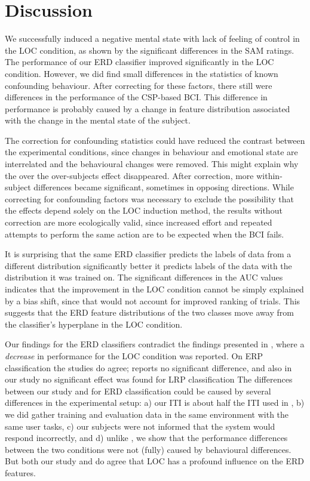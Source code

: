 \section{Discussion}
We successfully induced a negative mental state with lack of feeling of control
in the \ac{LOC} condition, as shown by the significant differences in the
\ac{SAM} ratings.
% 
The performance of our \ac{ERD} classifier improved significantly in the
\ac{LOC} condition. However, we did find small differences in the statistics of
known confounding behaviour. After correcting for these factors, there still
were differences in the performance of the \ac{CSP}-based \ac{BCI}. This
difference in performance is probably caused by a change in feature
distribution associated with the change in the mental state of the subject.

The correction for confounding statistics could have reduced the contrast
between the experimental conditions, since changes in behaviour and emotional
state are interrelated and the behavioural changes were removed. This might
explain why the over the over-subjects effect disappeared. After correction,
more within-subject differences became significant, sometimes in opposing directions.
%
While correcting for confounding factors was necessary to exclude the
possibility that the effects depend solely on the \ac{LOC} induction method,
the results without correction are more ecologically valid, since increased
effort and repeated attempts to perform the same action are to be expected when
the \ac{BCI} fails.

It is surprising that the same \ac{ERD} classifier predicts the labels of data
from a different distribution significantly better it predicts labels of the
data with the distribution it was trained on. The significant differences in
the \ac{AUC} values indicates that the improvement in the \ac{LOC} condition
cannot be simply explained by a bias shift, since that would not account for improved ranking of trials. This suggests that the \ac{ERD}
feature distributions of the two classes move away from the classifier's
hyperplane in the \ac{LOC} condition.

Our findings for the \ac{ERD} classifiers contradict the findings presented in
\cite{jatzev2008ecn}, where a \emph{decrease} in performance for the \ac{LOC}
condition was reported.   
%
On \ac{ERP} classification the studies do agree; \cite{jatzev2008ecn}
reports no significant difference, and also in our study no significant effect
was found for \ac{LRP} classification
%
The differences between our study and \cite{jatzev2008ecn} for \ac{ERD}
classification could be caused by several differences in the experimental
setup: a) our \ac{ITI} is about half the \ac{ITI} used in \cite{jatzev2008ecn},
b) we did gather training and evaluation data in the same environment with the
same user tasks, c) our subjects were not informed that the system would
respond incorrectly, and d) unlike \cite{jatzev2008ecn}, we show that the
performance differences between the two conditions were not (fully) caused by
behavioural differences. But both our study and \cite{jatzev2008ecn} do agree
that \ac{LOC} has a profound influence on the \ac{ERD} features.

